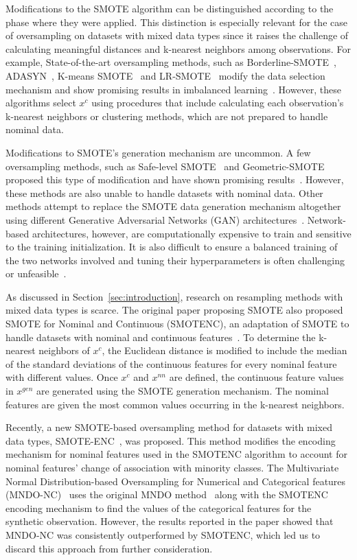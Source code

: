 \documentclass[preprint,12pt]{elsarticle}
\begin{document}
{Modifications to the SMOTE algorithm can be distinguished according to the
phase where they were applied. This distinction is especially relevant for the
case of oversampling on datasets with mixed data types since it raises the
challenge of calculating meaningful distances and k-nearest neighbors among
observations. For example, State-of-the-art oversampling methods, such as
Borderline-SMOTE~\cite{han2005borderline}, ADASYN~\cite{he2008adasyn}, K-means
SMOTE~\cite{douzas2018improving} and LR-SMOTE~\cite{liang2020lr} modify the
data selection mechanism and show promising results in imbalanced
learning~\cite{fonseca2021improving}. However, these algorithms select $x^c$
using procedures that include calculating each observation's k-nearest
neighbors or clustering methods, which are not prepared to handle nominal
data.

Modifications to SMOTE's generation mechanism are uncommon. A few oversampling
methods, such as Safe-level SMOTE~\cite{bunkhumpornpat2009safe} and
Geometric-SMOTE~\cite{douzas2019geometric} proposed this type of modification
and have shown promising results~\cite{douzas2019imbalanced}. However, these
methods are also unable to handle datasets with nominal data. Other
methods attempt to replace the SMOTE data generation mechanism altogether
using different Generative Adversarial Networks (GAN)
architectures~\cite{salazar2021generative, koivu2020synthetic, jo2022obgan}.
Network-based architectures, however, are computationally expensive to train
and sensitive to the training initialization. It is also difficult to ensure a
balanced training of the two networks involved and tuning their
hyperparameters is often challenging or unfeasible~\cite{gonog2019review}. 

As discussed in Section~\ref{sec:introduction}, research on resampling methods
with mixed data types is scarce. The original paper proposing SMOTE also
proposed SMOTE for Nominal and Continuous (SMOTENC), an adaptation of SMOTE to
handle datasets with nominal and continuous features~\cite{Chawla2002}. To
determine the k-nearest neighbors of $x^c$, the Euclidean distance is modified
to include the median of the standard
deviations of the continuous features for every nominal feature with
different values. Once $x^c$ and $x^{nn}$ are defined,  
the continuous feature values in $x^{gen}$ are generated using the SMOTE generation
mechanism. The nominal features are given the most common values
occurring in the k-nearest neighbors.

Recently, a new SMOTE-based oversampling method for
datasets with mixed data types, SMOTE-ENC~\cite{mukherjee2021smote}, was
proposed. This method modifies the encoding mechanism for nominal features
used in the SMOTENC algorithm to account for nominal features' change of
association with minority classes. The Multivariate Normal Distribution-based
Oversampling for Numerical and Categorical features
(MNDO-NC)~\cite{ambai2019multivariate} uses the original MNDO
method~\cite{ambai2018mndo} along with the SMOTENC encoding mechanism to find
the values of the categorical features for the synthetic observation. However,
the results reported in the paper showed that MNDO-NC was consistently
outperformed by SMOTENC, which led us to discard this approach from further
consideration.

}
\end{document}
